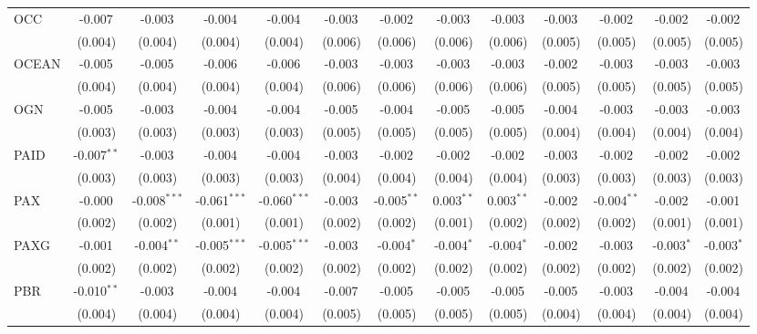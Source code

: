 \begin{table}[!htbp]
\begin{tabular}{@{\extracolsep{5pt}}lcccccccccccc}
 OCC & -0.007$^{}$ & -0.003$^{}$ & -0.004$^{}$ & -0.004$^{}$ & -0.003$^{}$ & -0.002$^{}$ & -0.003$^{}$ & -0.003$^{}$ & -0.003$^{}$ & -0.002$^{}$ & -0.002$^{}$ & -0.002$^{}$ \\
  & (0.004) & (0.004) & (0.004) & (0.004) & (0.006) & (0.006) & (0.006) & (0.006) & (0.005) & (0.005) & (0.005) & (0.005) \\
 OCEAN & -0.005$^{}$ & -0.005$^{}$ & -0.006$^{}$ & -0.006$^{}$ & -0.003$^{}$ & -0.003$^{}$ & -0.003$^{}$ & -0.003$^{}$ & -0.002$^{}$ & -0.003$^{}$ & -0.003$^{}$ & -0.003$^{}$ \\
  & (0.004) & (0.004) & (0.004) & (0.004) & (0.006) & (0.006) & (0.006) & (0.006) & (0.005) & (0.005) & (0.005) & (0.005) \\
 OGN & -0.005$^{}$ & -0.003$^{}$ & -0.004$^{}$ & -0.004$^{}$ & -0.005$^{}$ & -0.004$^{}$ & -0.005$^{}$ & -0.005$^{}$ & -0.004$^{}$ & -0.003$^{}$ & -0.003$^{}$ & -0.003$^{}$ \\
  & (0.003) & (0.003) & (0.003) & (0.003) & (0.005) & (0.005) & (0.005) & (0.005) & (0.004) & (0.004) & (0.004) & (0.004) \\
 PAID & -0.007$^{**}$ & -0.003$^{}$ & -0.004$^{}$ & -0.004$^{}$ & -0.003$^{}$ & -0.002$^{}$ & -0.002$^{}$ & -0.002$^{}$ & -0.003$^{}$ & -0.002$^{}$ & -0.002$^{}$ & -0.002$^{}$ \\
  & (0.003) & (0.003) & (0.003) & (0.003) & (0.004) & (0.004) & (0.004) & (0.004) & (0.003) & (0.003) & (0.003) & (0.003) \\
 PAX & -0.000$^{}$ & -0.008$^{***}$ & -0.061$^{***}$ & -0.060$^{***}$ & -0.003$^{}$ & -0.005$^{**}$ & 0.003$^{**}$ & 0.003$^{**}$ & -0.002$^{}$ & -0.004$^{**}$ & -0.002$^{}$ & -0.001$^{}$ \\
  & (0.002) & (0.002) & (0.001) & (0.001) & (0.002) & (0.002) & (0.001) & (0.002) & (0.002) & (0.002) & (0.001) & (0.001) \\
 PAXG & -0.001$^{}$ & -0.004$^{**}$ & -0.005$^{***}$ & -0.005$^{***}$ & -0.003$^{}$ & -0.004$^{*}$ & -0.004$^{*}$ & -0.004$^{*}$ & -0.002$^{}$ & -0.003$^{}$ & -0.003$^{*}$ & -0.003$^{*}$ \\
  & (0.002) & (0.002) & (0.002) & (0.002) & (0.002) & (0.002) & (0.002) & (0.002) & (0.002) & (0.002) & (0.002) & (0.002) \\
 PBR & -0.010$^{**}$ & -0.003$^{}$ & -0.004$^{}$ & -0.004$^{}$ & -0.007$^{}$ & -0.005$^{}$ & -0.005$^{}$ & -0.005$^{}$ & -0.005$^{}$ & -0.003$^{}$ & -0.004$^{}$ & -0.004$^{}$ \\
  & (0.004) & (0.004) & (0.004) & (0.004) & (0.005) & (0.005) & (0.005) & (0.005) & (0.004) & (0.004) & (0.004) & (0.004) \\

\end{tabular}
\end{table}
